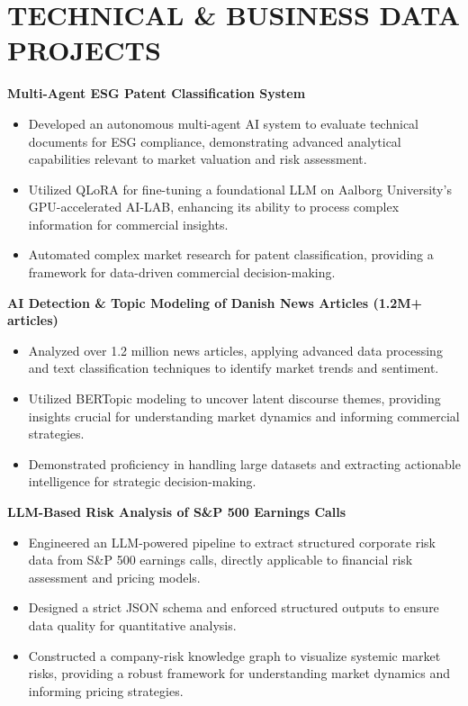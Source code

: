 \documentclass[10pt, letterpaper]{article}
\begin{document}
\section{TECHNICAL \& BUSINESS DATA PROJECTS}
\noindent\textbf{Multi-Agent ESG Patent Classification System} \hfill 
\begin{itemize}[leftmargin=0.15in, topsep=0pt, partopsep=0pt, itemsep=-2pt]
    \item Developed an autonomous multi-agent AI system to evaluate technical documents for ESG compliance, demonstrating advanced analytical capabilities relevant to market valuation and risk assessment.
    \item Utilized QLoRA for fine-tuning a foundational LLM on Aalborg University's GPU-accelerated AI-LAB, enhancing its ability to process complex information for commercial insights.
    \item Automated complex market research for patent classification, providing a framework for data-driven commercial decision-making.
\end{itemize}
\vspace{4pt}

\noindent\textbf{AI Detection \& Topic Modeling of Danish News Articles (1.2M+ articles)} \hfill 
\begin{itemize}[leftmargin=0.15in, topsep=0pt, partopsep=0pt, itemsep=-2pt]
    \item Analyzed over 1.2 million news articles, applying advanced data processing and text classification techniques to identify market trends and sentiment.
    \item Utilized BERTopic modeling to uncover latent discourse themes, providing insights crucial for understanding market dynamics and informing commercial strategies.
    \item Demonstrated proficiency in handling large datasets and extracting actionable intelligence for strategic decision-making.
\end{itemize}
\vspace{4pt}

\noindent\textbf{LLM-Based Risk Analysis of S\&P 500 Earnings Calls} \hfill 
\begin{itemize}[leftmargin=0.15in, topsep=0pt, partopsep=0pt, itemsep=-2pt]
    \item Engineered an LLM-powered pipeline to extract structured corporate risk data from S\&P 500 earnings calls, directly applicable to financial risk assessment and pricing models.
    \item Designed a strict JSON schema and enforced structured outputs to ensure data quality for quantitative analysis.
    \item Constructed a company-risk knowledge graph to visualize systemic market risks, providing a robust framework for understanding market dynamics and informing pricing strategies.
\end{itemize}
\vspace{4pt}
\end{document}
